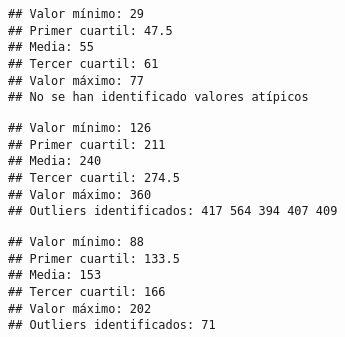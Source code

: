 \documentclass[
]{article}
\newenvironment{Shaded}{\begin{snugshade}}{\end{snugshade}}
\newcommand{\AttributeTok}[1]{\textcolor[rgb]{0.77,0.63,0.00}{#1}}
\newcommand{\DecValTok}[1]{\textcolor[rgb]{0.00,0.00,0.81}{#1}}
\newcommand{\FunctionTok}[1]{\textcolor[rgb]{0.00,0.00,0.00}{#1}}
\newcommand{\NormalTok}[1]{#1}
\newcommand{\SpecialCharTok}[1]{\textcolor[rgb]{0.00,0.00,0.00}{#1}}
\newcommand{\StringTok}[1]{\textcolor[rgb]{0.31,0.60,0.02}{#1}}
\begin{document}
\begin{Shaded}
\end{Shaded}

\begin{verbatim}
## Valor mínimo: 29 
## Primer cuartil: 47.5 
## Media: 55 
## Tercer cuartil: 61 
## Valor máximo: 77 
## No se han identificado valores atípicos
\end{verbatim}

\begin{Shaded}
\end{Shaded}

\begin{verbatim}
## Valor mínimo: 126 
## Primer cuartil: 211 
## Media: 240 
## Tercer cuartil: 274.5 
## Valor máximo: 360 
## Outliers identificados: 417 564 394 407 409
\end{verbatim}

\begin{Shaded}
\end{Shaded}

\begin{verbatim}
## Valor mínimo: 88 
## Primer cuartil: 133.5 
## Media: 153 
## Tercer cuartil: 166 
## Valor máximo: 202 
## Outliers identificados: 71
\end{verbatim}

\begin{Shaded}
\end{Shaded}
\end{document}
